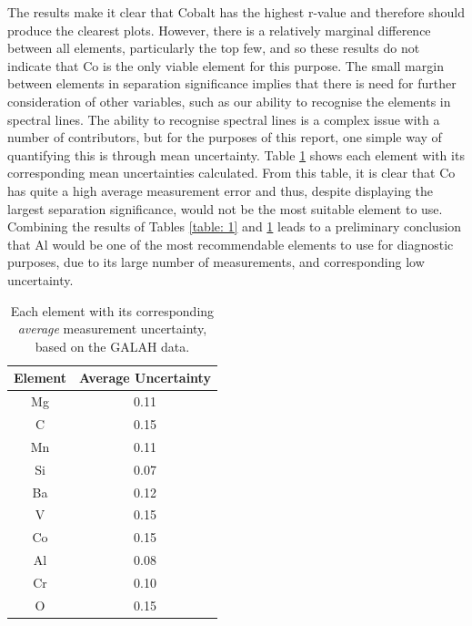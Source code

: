 \documentclass[fleqn,usenatbib]{mnras}
\begin{document}
The results make it clear that Cobalt has the highest r-value and therefore should produce the clearest plots. However, there is a relatively marginal difference between all elements, particularly the top few, and so these results do not indicate that Co is the only viable element for this purpose. The small margin between elements in separation significance implies that there is need for further consideration of other variables, such as our ability to recognise the elements in spectral lines.  
The ability to recognise spectral lines is a complex issue with a number of contributors, but for the purposes of this report, one simple way of quantifying this is through mean uncertainty. Table \ref{table: 2} shows each element with its corresponding mean uncertainties calculated. 
From this table, it is clear that Co has quite a high average measurement error and thus, despite displaying the largest separation significance, would not be the most suitable element to use. Combining the results of Tables \ref{table: 1} and \ref{table: 2} leads to a preliminary conclusion that Al would be one of the most recommendable elements to use for diagnostic purposes, due to its large number of measurements, and corresponding low uncertainty.  
\begin{center}
\begin{table}
    \centering
    \begin{tabular}{ |c|c| } 
     \hline
     Element & {Average Uncertainty} \\ 
     \hline\hline
      Mg & 0.11  \\ 
     \hline
     C & 0.15  \\ 
     \hline
     Mn & 0.11 \\
    \hline
     Si & 0.07 \\
     \hline
     Ba & 0.12 \\
     \hline
     V & 0.15 \\
     \hline
     Co & 0.15 \\
     \hline
     Al & 0.08 \\
     \hline
     Cr & 0.10 \\
     \hline
     O & 0.15\\
     \hline
    \end{tabular}
    \caption{Each element with its corresponding \textit{average} measurement uncertainty, based on the GALAH data.}
    \label{table: 2}
\end{table}
\end{center}
\end{document}
